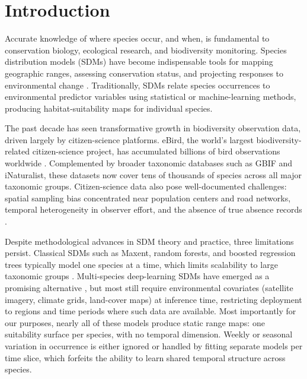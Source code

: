 \section{Introduction}
\label{sec:intro}

Accurate knowledge of where species occur, and when, is fundamental to conservation biology, ecological research, and biodiversity monitoring. Species distribution models (SDMs) have become indispensable tools for mapping geographic ranges, assessing conservation status, and projecting responses to environmental change \citep{elith2009species,guisan2013predicting,araujo2019standards}. Traditionally, SDMs relate species occurrences to environmental predictor variables using statistical or machine-learning methods, producing habitat-suitability maps for individual species.

The past decade has seen transformative growth in biodiversity observation data, driven largely by citizen-science platforms. eBird, the world's largest biodiversity-related citizen-science project, has accumulated billions of bird observations worldwide \citep{sullivan2009ebird,sullivan2014ebird}. Complemented by broader taxonomic databases such as GBIF and iNaturalist, these datasets now cover tens of thousands of species across all major taxonomic groups. Citizen-science data also pose well-documented challenges: spatial sampling bias concentrated near population centers and road networks, temporal heterogeneity in observer effort, and the absence of true absence records \citep{phillips2009sample,isaac2014statistics,bird2014statistical,kelling2019semistructured,botella2020bias,johnston2021analytical}.

Despite methodological advances in SDM theory and practice, three limitations persist. Classical SDMs such as Maxent, random forests, and boosted regression trees typically model one species at a time, which limits scalability to large taxonomic groups \citep{elith2009species}. Multi-species deep-learning SDMs have emerged as a promising alternative \citep{beery2021sdmreview,botella2018deep,deneu2021convolutional}, but most still require environmental covariates (satellite imagery, climate grids, land-cover maps) at inference time, restricting deployment to regions and time periods where such data are available. Most importantly for our purposes, nearly all of these models produce static range maps: one suitability surface per species, with no temporal dimension. Weekly or seasonal variation in occurrence is either ignored or handled by fitting separate models per time slice, which forfeits the ability to learn shared temporal structure across species.

